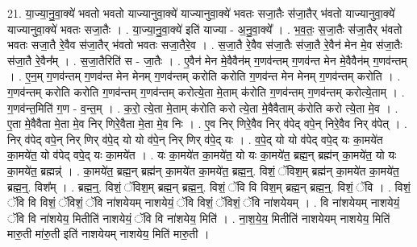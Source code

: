 \documentclass[17pt]{extarticle}
\begin{document}
21. या॒ज्या॒नु॒वा॒क्ये॑ भवतो भवतो याज्यानुवा॒क्ये॑ याज्यानुवा॒क्ये॑ भवतः सजा॒तैः स॑जा॒तैर् भ॑वतो याज्यानुवा॒क्ये॑ याज्यानुवा॒क्ये॑ भवतः सजा॒तैः । . या॒ज्या॒नु॒वा॒क्ये॑ इति॑ याज्या - अ॒नु॒वा॒क्ये᳚ । . भ॒व॒तः॒ स॒जा॒तैः स॑जा॒तैर् भ॑वतो भवतः सजा॒तै रे॒वैव स॑जा॒तैर् भ॑वतो भवतः सजा॒तैरे॒व । . स॒जा॒तै रे॒वैव स॑जा॒तैः स॑जा॒तै रे॒वैन॑ मेन मे॒व स॑जा॒तैः स॑जा॒तै रे॒वैन᳚म् । . स॒जा॒तैरिति॑ स - जा॒तैः । . ए॒वैन॑ मेन मे॒वैवैन॑म् ग॒णव॑न्तम् ग॒णव॑न्त मेन मे॒वैवैन॑म् ग॒णव॑न्तम् । . ए॒न॒म् ग॒णव॑न्तम् ग॒णव॑न्त मेन मेनम् ग॒णव॑न्तम् करोति करोति ग॒णव॑न्त मेन मेनम् ग॒णव॑न्तम् करोति । . ग॒णव॑न्तम् करोति करोति ग॒णव॑न्तम् ग॒णव॑न्तम् करोत्ये॒ता मे॒ताम् क॑रोति ग॒णव॑न्तम् ग॒णव॑न्तम् करोत्ये॒ताम् । . ग॒णव॑न्त॒मिति॑ ग॒ण - व॒न्त॒म् । . क॒रो॒ त्ये॒ता मे॒ताम् क॑रोति करो त्ये॒ता मे॒वैवैताम् क॑रोति करो त्ये॒ता मे॒व । . ए॒ता मे॒वैवैता मे॒ता मे॒व निर् णिरे॒वैता मे॒ता मे॒व निः । . ए॒व निर् णिरे॒वैव निर् व॑पेद् वपे॒न् निरे॒वैव निर् व॑पेत् । . निर् व॑पेद् वपे॒न् निर् णिर् व॑पे॒द् यो यो व॑पे॒न् निर् णिर् व॑पे॒द् यः । . व॒पे॒द् यो यो व॑पेद् वपे॒द् यः का॒मये॑त का॒मये॑त॒ यो व॑पेद् वपे॒द् यः का॒मये॑त । . यः का॒मये॑त का॒मये॑त॒ यो यः का॒मये॑त॒ ब्रह्म॒न् ब्रह्म॑न् का॒मये॑त॒ यो यः का॒मये॑त॒ ब्रह्मन्न्॑ । . का॒मये॑त॒ ब्रह्म॒न् ब्रह्म॑न् का॒मये॑त का॒मये॑त॒ ब्रह्म॒न्॒. विशं॒ ॅविश॒म् ब्रह्म॑न् का॒मये॑त का॒मये॑त॒ ब्रह्म॒न्॒. विश᳚म् । . ब्रह्म॒न्॒. विशं॒ ॅविश॒म् ब्रह्म॒न् ब्रह्म॒न्॒. विशं॒ ॅवि वि विश॒म् ब्रह्म॒न् ब्रह्म॒न्॒. विशं॒ ॅवि । . विशं॒ ॅवि वि विशं॒ ॅविशं॒ ॅवि ना॑शयेयम् नाशयेयं॒ ॅवि विशं॒ ॅविशं॒ ॅवि ना॑शयेयम् । . वि ना॑शयेयम् नाशयेयं॒ ॅवि वि ना॑शयेय॒ मितीति॑ नाशयेयं॒ ॅवि वि ना॑शयेय॒ मिति॑ । . ना॒श॒ये॒य॒ मितीति॑ नाशयेयम् नाशयेय॒ मिति॑ मारु॒ती मा॑रु॒ती इति॑ नाशयेयम् नाशयेय॒ मिति॑ मारु॒ती । \newline
\end{document}
